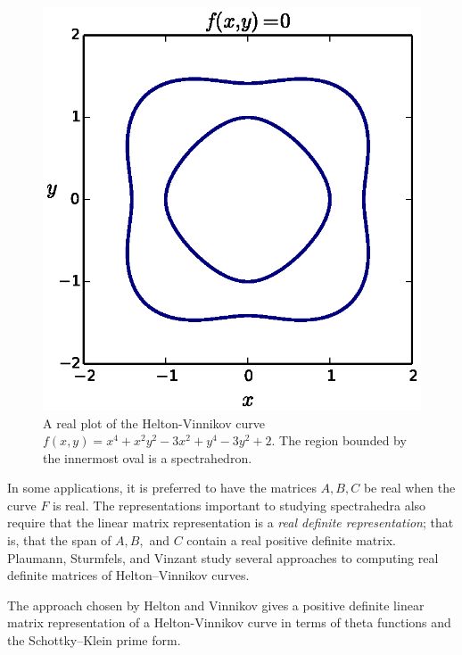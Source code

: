 \begin{figure}[t]
  \centering
  \includegraphics[width=\textwidth]{images/heltonvinnikov.eps}
  \caption{A real plot of the Helton-Vinnikov curve $f(x,y) = x^{4} +
    x^{2} y^{2} - 3 x^{2} + y^{4} - 3 y^{2} + 2$. The region bounded by
    the innermost oval is a spectrahedron.}
  \label{fig: spectrahedron}
\end{figure}

In some applications, it is preferred to have the matrices $A,B,C$ be
real when the curve $F$ is real. The representations important to
studying spectrahedra also require that the linear matrix representation
is a {\it real definite representation}; that is, that the span of
$A,B,$ and $C$ contain a real positive definite matrix. Plaumann,
Sturmfels, and Vinzant \cite{PSV10} study several approaches to
computing real definite matrices of Helton--Vinnikov curves.

The approach chosen by Helton and Vinnikov gives a positive definite
linear matrix representation of a Helton-Vinnikov curve in terms of
theta functions and the Schottky--Klein prime form.

